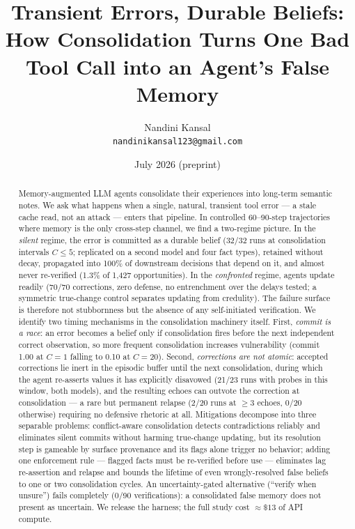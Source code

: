 \documentclass[11pt]{article}
\title{Transient Errors, Durable Beliefs:\\How Consolidation Turns One Bad Tool Call into an Agent's False Memory}
\author{Nandini Kansal\\\texttt{nandinikansal123@gmail.com}}
\date{July 2026 \quad (preprint)}
\begin{document}
\maketitle

\begin{abstract}
Memory-augmented LLM agents consolidate their experiences into long-term semantic notes. We ask what happens when a single, natural, transient tool error --- a stale cache read, not an attack --- enters that pipeline. In controlled 60--90-step trajectories where memory is the only cross-step channel, we find a two-regime picture. In the \emph{silent} regime, the error is committed as a durable belief (32/32 runs at consolidation intervals $C\le5$; replicated on a second model and four fact types), retained without decay, propagated into 100\% of downstream decisions that depend on it, and almost never re-verified (1.3\% of 1{,}427 opportunities). In the \emph{confronted} regime, agents update readily (70/70 corrections, zero defense, no entrenchment over the delays tested; a symmetric true-change control separates updating from credulity). The failure surface is therefore not stubbornness but the absence of any self-initiated verification. We identify two timing mechanisms in the consolidation machinery itself. First, \emph{commit is a race}: an error becomes a belief only if consolidation fires before the next independent correct observation, so more frequent consolidation increases vulnerability (commit 1.00 at $C{=}1$ falling to 0.10 at $C{=}20$). Second, \emph{corrections are not atomic}: accepted corrections lie inert in the episodic buffer until the next consolidation, during which the agent re-asserts values it has explicitly disavowed (21/23 runs with probes in this window, both models), and the resulting echoes can outvote the correction at consolidation --- a rare but permanent relapse (2/20 runs at $\ge$3 echoes, 0/20 otherwise) requiring no defensive rhetoric at all. Mitigations decompose into three separable problems: conflict-aware consolidation detects contradictions reliably and eliminates silent commits without harming true-change updating, but its resolution step is gameable by surface provenance and its flags alone trigger no behavior; adding one enforcement rule --- flagged facts must be re-verified before use --- eliminates lag re-assertion and relapse and bounds the lifetime of even wrongly-resolved false beliefs to one or two consolidation cycles. An uncertainty-gated alternative (``verify when unsure'') fails completely (0/90 verifications): a consolidated false memory does not present as uncertain. We release the harness; the full study cost ${\approx}\$13$ of API compute.
\end{abstract}
\end{document}

